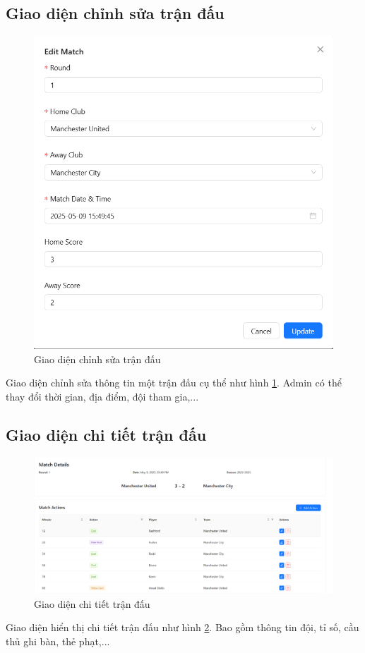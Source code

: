 \documentclass[../BTL.tex]{subfiles}
\begin{document}
\subsection{Giao diện chỉnh sửa trận đấu}
\begin{figure}
    \centering
    \includegraphics[width=1\linewidth]{Hinhve/admin_edit_match.png}
    \caption{Giao diện chỉnh sửa trận đấu}
    \label{fig:admin_edit_match}
\end{figure}
Giao diện chỉnh sửa thông tin một trận đấu cụ thể như hình \ref{fig:admin_edit_match}. Admin có thể thay đổi thời gian, địa điểm, đội tham gia,...

\subsection{Giao diện chi tiết trận đấu}
\begin{figure}
    \centering
    \includegraphics[width=1\linewidth]{Hinhve/admin_match_actions.png}
    \caption{Giao diện chi tiết trận đấu}
    \label{fig:admin_match_actions}
\end{figure}
Giao diện hiển thị chi tiết trận đấu như hình \ref{fig:admin_match_actions}. Bao gồm thông tin đội, tỉ số, cầu thủ ghi bàn, thẻ phạt,...
\end{document}
